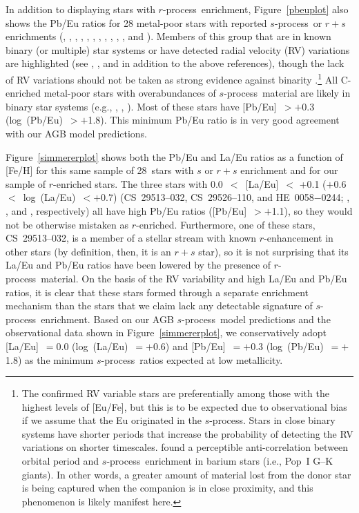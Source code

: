 \documentclass{emulateapj}
\def\rpro{\mbox{$r$-process}}
\def\spro{\mbox{$s$-process}}
\begin{document}
In addition to displaying stars with \rpro\ enrichment,
Figure~\ref{pbeuplot} also shows
the Pb/Eu ratios for 28 metal-poor stars with reported
\spro\ or $r+s$ enrichments
(\citealt{aoki01,aoki02}, 
\citealt{barbuy05},
\citealt{barklem05},
\citealt{cohen03,cohen06},
\citealt{goswami06},
\citealt{ivans05},
\citealt{johnson04},
\citealt{jonsell06},
\citealt{preston01},
\citealt{roederer08b,roederer10a}, 
\citealt{simmerer04}, and
\citealt{thompson08}).
Members of this group that are in known binary (or multiple) star
systems or have detected radial velocity (RV) variations are 
highlighted 
(see \citealt{aoki03}, \citealt{carney03}, and \citealt{preston09} 
in addition to the above references), 
though the lack of RV variations should
not be taken as strong evidence against binarity \citep{preston09}.\footnote{
The confirmed RV variable stars are preferentially
among those with the highest levels of [Eu/Fe], but this is
to be expected due to observational bias if we assume that
the Eu originated in the \spro.
Stars in close binary systems have shorter periods that 
increase the probability of detecting the RV variations
on shorter timescales.
\citet{boffin94} found a perceptible anti-correlation between 
orbital period and \spro\ enrichment in barium stars
(i.e., Pop~I G--K giants).
In other words, a greater amount of material lost from the
donor star is being captured when the companion is in close proximity,
and this phenomenon is likely manifest here.}
All C-enriched
metal-poor stars with overabundances of \spro\ material
are likely in binary star systems
(e.g., \citealt{mcclure80}, \citealt{mcclure83}, \citealt{lucatello05}).
Most of these stars have 
[Pb/Eu]~$> +$0.3 (log~(Pb/Eu)~$> +$1.8).  
This minimum Pb/Eu ratio is in very good agreement with 
our AGB model predictions.

Figure~\ref{simmererplot} shows both the Pb/Eu and La/Eu
ratios as a function of [Fe/H] for this same sample of 28~stars
with $s$ or $r+s$ enrichment and for our sample of $r$-enriched stars.
The three stars with 0.0~$<$~[La/Eu]~$<$ +0.1 
($+$0.6~$<$~log~(La/Eu)~$< +0.7$)
(\mbox{CS~29513--032}, \mbox{CS~29526--110}, and \mbox{HE~0058$-$0244};
\citealt{roederer10a}, \citealt{aoki02}, and \citealt{cohen06}, respectively)
all have high Pb/Eu ratios ([Pb/Eu]~$> +$1.1), 
so they would not be otherwise mistaken as $r$-enriched.
Furthermore, one of these stars, \mbox{CS~29513--032}, is a member of a
stellar stream with known $r$-enhancement in other stars
(by definition, then, it is an $r+s$ star), so it is 
not surprising that its La/Eu and Pb/Eu ratios have been lowered by the 
presence of \rpro\ material.
On the basis of the RV variability and high La/Eu and Pb/Eu ratios,
it is clear that these stars formed through a separate
enrichment mechanism than the stars that we claim lack
any detectable signature of \spro\ enrichment.
Based on our AGB \spro\ model predictions and the observational
data shown in Figure~\ref{simmererplot}, 
we conservatively adopt 
[La/Eu]~$= 0.0$ (log~(La/Eu)~$= +$0.6) and 
[Pb/Eu]~$= +0.3$ (log~(Pb/Eu)~$= +$1.8)
as the minimum \spro\ ratios expected at low metallicity.
\end{document}
